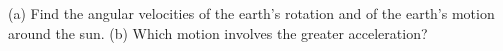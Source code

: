 (a) Find the angular velocities of the earth's rotation
and of the earth's motion around the sun.\answercheck\hwendpart
 (b) Which motion
involves the greater acceleration?
